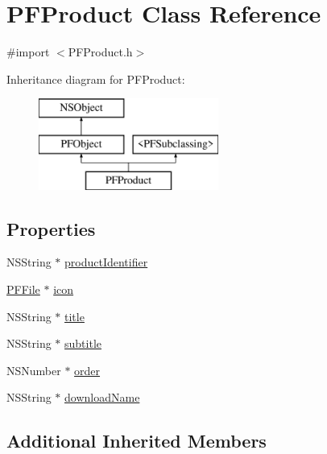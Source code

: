 \hypertarget{interface_p_f_product}{}\section{P\+F\+Product Class Reference}
\label{interface_p_f_product}


{\ttfamily \#import $<$P\+F\+Product.\+h$>$}

Inheritance diagram for P\+F\+Product\+:\begin{figure}[H]
\begin{center}
\leavevmode
\includegraphics[height=3.000000cm]{interface_p_f_product}
\end{center}
\end{figure}
\subsection*{Properties}
\begin{DoxyCompactItemize}
\item 
N\+S\+String $\ast$ \hyperlink{interface_p_f_product_a354f59da62a2d695096b10f36e75a084}{product\+Identifier}
\begin{DoxyCompactList}\small\item\em 

 \end{DoxyCompactList}\item 
\hyperlink{interface_p_f_file}{P\+F\+File} $\ast$ \hyperlink{interface_p_f_product_a23132bc0aeaa67fa7d7e49b477818477}{icon}
\item 
N\+S\+String $\ast$ \hyperlink{interface_p_f_product_aca711bfd74798b7d0563d5ff5719c6d9}{title}
\item 
N\+S\+String $\ast$ \hyperlink{interface_p_f_product_a83e9bd4db5d395daf5d7d61094d0293d}{subtitle}
\item 
N\+S\+Number $\ast$ \hyperlink{interface_p_f_product_a8e78e9f4607e77954c425698ec7a151f}{order}
\item 
N\+S\+String $\ast$ \hyperlink{interface_p_f_product_a1462cf0bd4dffe98775e3439208ec238}{download\+Name}
\end{DoxyCompactItemize}
\subsection*{Additional Inherited Members}


